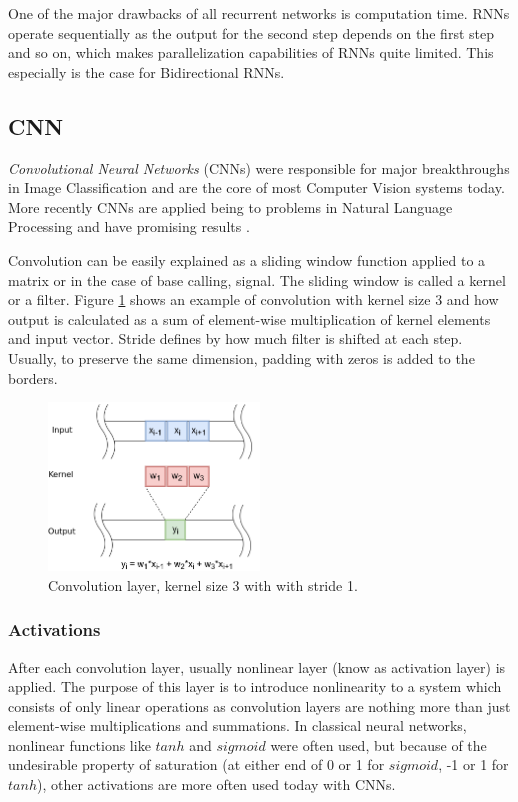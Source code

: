 \documentclass[times, utf8, diplomski, numeric, english]{fer}
\begin{document}
One of the major drawbacks of all recurrent networks is computation time. RNNs operate sequentially as the output for the second step depends on the first step and so on, which makes parallelization capabilities of RNNs quite limited. This especially is the case for Bidirectional RNNs.

\subsection{CNN}

\textit{Convolutional Neural Networks }(CNNs) were responsible for major breakthroughs in Image Classification and are the core of most Computer Vision systems today. More recently CNNs are applied being to problems in Natural Language Processing and have promising results \cite{bytenet}\cite{facebook}.

Convolution can be easily explained as a sliding window function applied to a matrix or in the case of base calling, signal. The sliding window is called a kernel or a filter. Figure \ref{fg:convolution} shows an example of convolution with kernel size 3 and how output is calculated as a sum of element-wise multiplication of kernel elements and input vector. Stride defines by how much filter is shifted at each step. Usually, to preserve the same dimension, padding with zeros is added to the borders. 

\begin{figure}[H]
	\begin{center}
		\includegraphics[width=0.5\textwidth]{./imgs/convolution.png}
		\caption{Convolution layer, kernel size 3 with with stride 1.}
		\label{fg:convolution}
	\end{center}
\end{figure}


\subsubsection{Activations}
After each convolution layer, usually nonlinear layer (know as activation layer) is applied. The purpose of this layer is to introduce nonlinearity to a system which consists of only linear operations as convolution layers are nothing more than just element-wise multiplications and summations. In classical neural networks, nonlinear functions like $ tanh $ and $ sigmoid $ were often used, but because of the undesirable property of saturation (at either end of 0 or 1 for $ sigmoid $, -1 or 1 for $ tanh $), other activations are more often used today with CNNs. 
\end{document}
